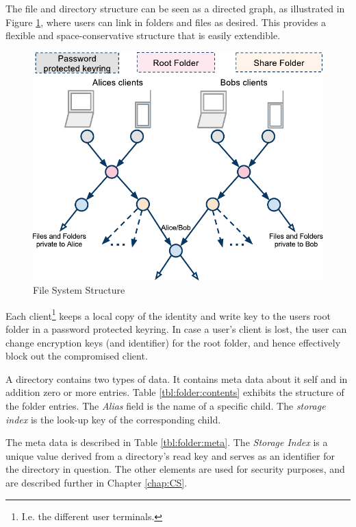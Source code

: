 \documentclass[pdftex,english,10pt,b5paper,twoside]{book}
\begin{document}
The file and directory structure can be seen as a directed graph, as illustrated
in Figure \ref{fig:AS:filesystem}, where users can link in folders and files as
desired. This provides a flexible and space-conservative structure that is easily
extendible.

\begin{figure}[h!]
    \centering
    \includegraphics[width=\columnwidth]{ArchitectureFileSystem.pdf}
    \caption{File System Structure}
    \label{fig:AS:filesystem}
\end{figure}

Each client\footnote{I.e. the different user terminals.} keeps a local copy of
the identity and write key to the users root folder in a password
protected keyring. In case a user's client is lost, the user can change
encryption keys (and identifier) for the root folder, and hence effectively
block out the compromised client.

A directory contains two types of data. It contains meta data about it self and
in addition zero or more entries. Table \ref{tbl:folder:contents} exhibits the
structure of the folder entries. The \emph{Alias} field is the name of a
specific child. The \emph{storage index} is the look-up key of the
corresponding child.



The meta data is described in Table \ref{tbl:folder:meta}. The \emph{Storage
Index} is a unique value derived from a directory's read key and serves as an
identifier for the directory in question. The other elements are used for
security purposes, and are described further in Chapter \ref{chap:CS}.
\end{document}
